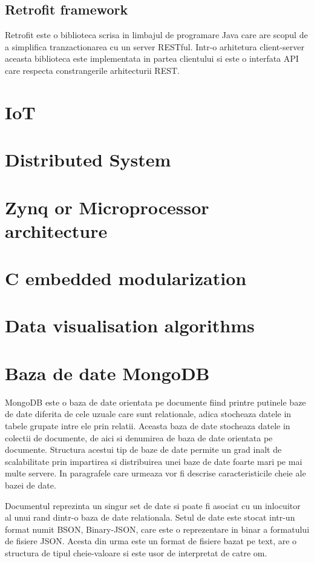 \subsection{Retrofit framework}\label{sec:retrofit}
Retrofit este o biblioteca scrisa in limbajul de programare Java care are scopul de a simplifica tranzactionarea cu un server RESTful. Intr-o arhitetura 
client-server aceasta biblioteca este implementata in partea clientului si este o interfata API care respecta constrangerile arhitecturii REST.



\section{IoT}\label{sec:iot}
\section{Distributed System}\label{sec:distributed}
\section{Zynq or Microprocessor architecture}\label{sec:zynq}
\section{C embedded modularization}\label{sec:cembedded}
\section{Data visualisation algorithms}\label{sec:graph}
\section{Baza de date MongoDB}\label{sec:mongodb}
MongoDB este o baza de date orientata pe documente fiind printre putinele baze de date diferita de cele uzuale care sunt relationale, adica stocheaza datele in tabele 
grupate intre ele prin relatii. Aceasta baza de date stocheaza datele in colectii de documente, de aici si denumirea de baza de date orientata pe documente. 
Structura acestui tip de baze de date permite un grad inalt de scalabilitate prin impartirea si distribuirea unei baze de date foarte mari pe mai multe 
servere. In paragrafele care urmeaza vor fi descrise caracteristicile cheie ale bazei de date.

Documentul reprezinta un singur set de date si poate fi asociat cu un inlocuitor al unui rand dintr-o baza de date relationala. Setul de date este stocat intr-un 
format numit BSON, Binary-JSON, care este o reprezentare in binar a formatului de fisiere JSON. Acesta din urma este un format de fisiere bazat pe text,
are o structura de tipul cheie-valoare si este usor de interpretat de catre om.

